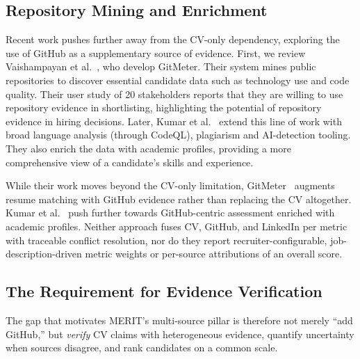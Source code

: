 \subsection{Repository Mining and Enrichment}
Recent work pushes further away from the CV-only dependency, exploring the use of GitHub as a supplementary 
source of evidence. First, we review Vaishampayan et al.~\cite{vaishampayan2025_gitmeter}, who develop GitMeter.
Their system mines public repositories to discover essential candidate data such as technology use and code quality.
Their user study of 20 stakeholders reports that they are willing to use repository evidence in shortlisting,
highlighting the potential of repository evidence in hiring decisions. Later, Kumar et al.~\cite{kumar2025_evidence_hiring}
extend this line of work with broad language analysis (through CodeQL), plagiarism and AI-detection tooling.
They also enrich the data with academic profiles, providing a more comprehensive view of a candidate's skills and experience.

\label{sec:contrastive-github-hiring}
While their work moves beyond the CV-only limitation, GitMeter~\cite{vaishampayan2025_gitmeter} augments resume matching with GitHub
evidence rather than replacing the CV altogether. Kumar et al.~\cite{kumar2025_evidence_hiring} push further towards GitHub-centric
assessment enriched with academic profiles. Neither approach fuses CV, GitHub, and LinkedIn per metric with traceable conflict resolution,
nor do they report recruiter-configurable, job-description-driven metric weights or per-source attributions of an overall score.

\subsection{The Requirement for Evidence Verification}
The gap that motivates MERIT's multi-source pillar is therefore not merely ``add GitHub,'' but \emph{verify} 
CV claims with heterogeneous evidence, quantify uncertainty when sources disagree, and rank candidates on a common scale.


